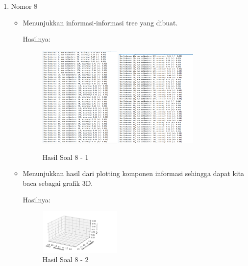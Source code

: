 \begin{enumerate}
\item Nomor 8
\begin{itemize}
\item Menunjukkan informasi-informasi tree yang dibuat.

Hasilnya:
\begin{figure}[H]
	\centering
		\includegraphics[width=4cm]{figures/1174054/3/34.png}
		\includegraphics[width=4cm]{figures/1174054/3/35.png}
		\caption{Hasil Soal 8 - 1}
\end{figure}
		
\item Menunjukkan hasil dari plotting komponen informasi sehingga dapat kita baca sebagai grafik 3D.

Hasilnya:
\begin{figure}[H]
	\centering
		\includegraphics[width=4cm]{figures/1174054/3/36.png}
		\caption{Hasil Soal 8 - 2}
\end{figure}
\end{itemize}
\end{enumerate}


